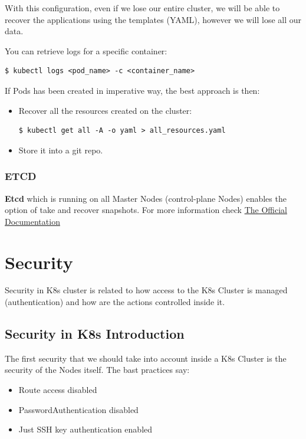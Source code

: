 \documentclass{article}
\newenvironment{blocktemplateII}[1]{%
    \tcolorbox[beamer,%
    noparskip,breakable,
    colframe=Green,%
    colbacklower=LimeGreen!75!LightGreen,%
    title=#1]}%
    {\endtcolorbox}
\newenvironment{codetemplate}[1][]{%
  \mybasecolorbox[#1]
  \itshape
}{%
  \endmybasecolorbox
}
\begin{document}
With this configuration, even if we lose our entire cluster, we will be able to recover the applications using the templates (YAML), however we will lose all our data.

You can retrieve logs for a specific container:
\begin{codetemplate}{}
\begin{verbatim}
$ kubectl logs <pod_name> -c <container_name>
\end{verbatim}
\end{codetemplate}

\begin{blocktemplateII}{NOTE}
If Pods has been created in imperative way, the best approach is then:
\begin{itemize}
    \item Recover all the resources created on the cluster:
\begin{codetemplate}{}
\begin{verbatim}
$ kubectl get all -A -o yaml > all_resources.yaml
\end{verbatim}
\end{codetemplate}

    \item Store it into a git repo.
\end{itemize}
\end{blocktemplateII}

\subsubsection{ETCD}
\textbf{Etcd} which is running on all Master Nodes (control-plane Nodes) enables the option of take and recover snapshots. For more information check \href{https://kubernetes.io/docs/tasks/administer-cluster/configure-upgrade-etcd/}{The Official Documentation}

\newpage
\section{Security}

Security in K8s cluster is related to how access to the K8s Cluster is managed (authentication) and how are the actions controlled inside it.


\subsection{Security in K8s Introduction}
The first security that we should take into account inside a K8s Cluster is the security of the Nodes itself. The bast practices say:
\begin{itemize}
    \item Route access disabled
    \item PasswordAuthentication disabled
    \item Just SSH key authentication enabled
\end{itemize}
\end{document}
